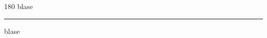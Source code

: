 
\begin{frame}
\begin{center}
\begin{turn}{180}
{\fontsize{2.5cm}{1em}\selectfont blase}
\end{turn}
\vspace{1em}\par  
\hrule
\vspace{1em}\par  
{\fontsize{2.5cm}{1em}\selectfont blase}
\end{center}
\end{frame}
